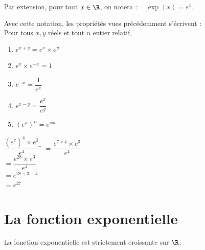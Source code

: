\documentclass[a4paper,11pt,cours]{nsi} %
\begin{document}
\begin{notation}[ ]
	Par extension, pour tout $x\in \R$, on notera : $\quad \exp(x)=e^x$.
\end{notation}

\begin{propriete}[]
	Avec cette notation, les propriétés vues précédemment s'écrivent :\\
	Pour tous $x, y$ réels et tout $n$ entier relatif,
	\begin{multicols}{5}
		\begin{enumerate}[label=\textbullet]
			\item 	$e^{x+y}=e^x\times e^y$
			\item 	$e^x\times e^{-x}=1$
			\item	$e^{-x}=\dfrac{1}{e^x}$
			\item	$e^{x-y}=\dfrac{e^x}{e^y}$
			\item	$\left(e^x\right)^n=e^{nx}$
		\end{enumerate}
	\end{multicols} 
\end{propriete}

\begin{exemple}[]
	\begin{tabbing}
		$\dfrac{\left(e^7\right)^4\times e^3}{e^4}$	\= $=\dfrac{e^{7\times 4}\times e^3}{e^4}$\\[0.5em]
		\>	$=\dfrac{e^{28}\times e^3}{e^4}$\\[0.5em]
		\>	$=e^{28+3-4}$\\[0.5em]
		\>	$=e^{27}$
	\end{tabbing}
\end{exemple}

\section{La fonction exponentielle}

\begin{propriete}[]
	La fonction exponentielle est strictement croissante sur $\R$.
	\begin{center}
		\def\xmin{-5} \def\ymin{-1}\def\xmax{3}\def\ymax{5}
		\def\F{exp(\x)}
	\end{center}
\end{propriete}
\end{document}
